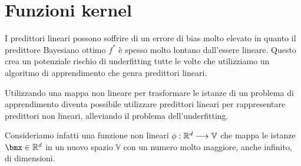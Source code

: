 \documentclass[\main/main.tex]{subfiles}
\begin{document}
\chapter{Funzioni kernel}
\begin{multicols}{2}
\begin{observation}
    I predittori lineari possono soffrire di un errore di bias molto elevato in quanto il predittore Bayesiano ottimo \(f^*\) è spesso molto lontano dall'essere lineare. Questo crea un potenziale rischio di underfitting tutte le volte che utilizziamo un algoritmo di apprendimento che genra predittori lineari.
\end{observation}
\begin{observation}
    Utilizzando una mappa non lineare per trasformare le istanze di un problema di apprendimento diventa possibile utilizzare predittori lineari per rappresentare predittori non lineari, alleviando il problema dell'underfitting.
    
    Consideriamo infatti una funzione non lineari \(\phi:\mathbb{R}^d\longrightarrow \mathbb{V}\) che mappa le istanze \(\bmx \in \R^d\) in un nuovo spazio \(\mathbb{V}\) con un numero molto maggiore, anche infinito, di dimensioni.
    

\end{observation}
\end{multicols}
\end{document}
